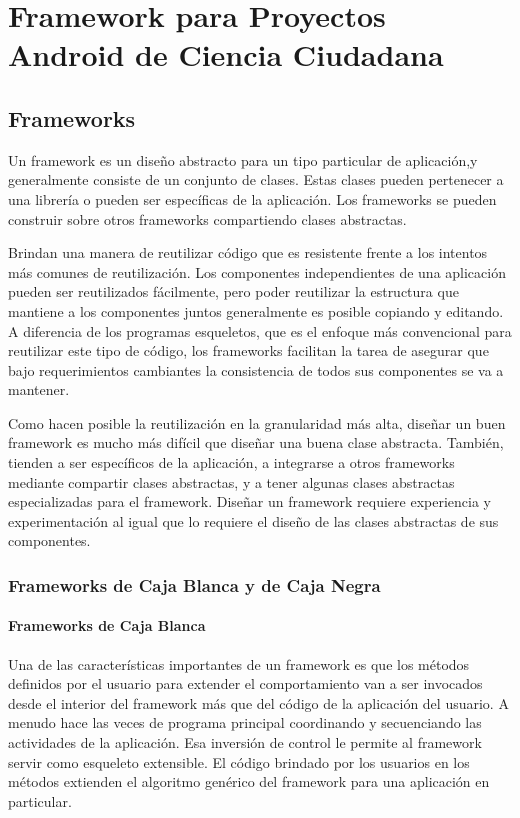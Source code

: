 \chapter{Framework para Proyectos Android de Ciencia Ciudadana}

\section{Frameworks}

	Un framework es un diseño abstracto para un tipo particular de aplicación,y generalmente consiste de un conjunto de clases. Estas clases pueden pertenecer a una librería o pueden ser específicas de la aplicación. Los frameworks se pueden construir sobre otros frameworks compartiendo clases abstractas.
	
	Brindan una manera de reutilizar código que es resistente frente a los intentos más comunes de reutilización. Los componentes independientes de una aplicación pueden ser reutilizados fácilmente, pero poder reutilizar la estructura que mantiene a los componentes juntos generalmente es posible copiando y editando. A diferencia de los programas esqueletos, que es el enfoque más convencional para reutilizar este tipo de código, los frameworks facilitan la tarea de asegurar que bajo requerimientos cambiantes la consistencia de todos sus componentes se va a mantener.
	
	Como hacen posible la reutilización en la granularidad más alta, diseñar un buen framework es mucho más difícil que diseñar una buena clase abstracta. También, tienden a ser específicos de la aplicación, a integrarse a otros frameworks mediante compartir clases abstractas, y a tener algunas clases abstractas especializadas para el framework. Diseñar un framework requiere experiencia y experimentación al igual que lo requiere el diseño de las clases abstractas de sus componentes.

\subsection{Frameworks de Caja Blanca y de Caja Negra}
\subsubsection{Frameworks de Caja Blanca}

	Una de las características importantes de un framework es que los métodos definidos por el usuario para extender el comportamiento van a ser invocados desde el interior del framework más que del código de la aplicación del usuario. A menudo hace las veces de programa principal coordinando y secuenciando las actividades de la aplicación. Esa inversión de control le permite al framework servir como esqueleto extensible. El código brindado por los usuarios en los métodos extienden el algoritmo genérico del framework para una aplicación en particular. 
	
